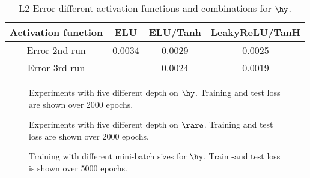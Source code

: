\begin{table}[!htbp]\centering
	\begin{tabular}{ |c|c|c|c| }
		\hline
		Activation function & ELU & ELU/Tanh & LeakyReLU/TanH \\ 
		\hline
		Error 2nd run& 0.0034 & 0.0029 & 0.0025\\ \hline
		Error 3rd run& 		  & 0.0024 & 0.0019 \\ \hline
	\end{tabular}
	\caption{L2-Error different activation functions and combinations for $\hy$.}
	\label{Tab:Activations Rare 2nd}
\end{table}
\begin{center}
	\begin{figure}[htbp!]
		\scalebox{.9}{}
		\scalebox{.9}{}
		\scalebox{.9}{}
		\scalebox{.9}{}
		\scalebox{.9}{}
		\caption{Experiments with five different depth on $\hy$. Training and test loss are shown over 2000 epochs.}
		\label{Fig:Depth Hydro}
	\end{figure}
\end{center}
\begin{center}
	\begin{figure}[htbp!]
		\scalebox{.9}{}
		\scalebox{.9}{}
		\scalebox{.9}{}
		\scalebox{.9}{}
		\scalebox{.9}{}
		\caption{Experiments with five different depth on $\rare$. Training and test loss are shown over 2000 epochs.}
		\label{Fig:Depth Rare}
	\end{figure}
\end{center}
\begin{center}
	\begin{figure}[htbp!]
		\scalebox{.9}{}
		\scalebox{.9}{}
		\scalebox{.9}{}
		\scalebox{.9}{}
		\scalebox{.9}{}
		\scalebox{.9}{}
		\caption{Training with different mini-batch sizes for $\hy$. Train -and test loss is shown over 5000 epochs.}
		\label{Fig:Batch Hy}
	\end{figure}
\end{center}

